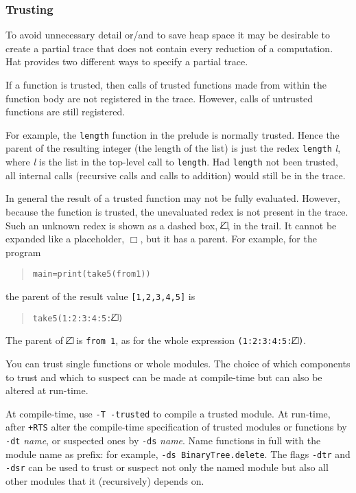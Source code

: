 \documentclass[12pt]{article}
\newenvironment{code}{\begin{quote}\begin{alltt}}{\end{alltt}\end{quote}}
\newcommand{\emptyBox}{\Box}
\newcommand{\dashedBox}{\Box\hspace{-9pt}\angle}
\begin{document}


\subsubsection{Trusting}\label{trusting}

To avoid unnecessary detail or/and to save heap space it may be desirable to create a partial trace that does not contain every reduction of a computation.
Hat provides two different ways to specify a partial trace.

If a function is trusted, then calls of trusted functions made from within the function body are not registered in the trace. However, calls of untrusted functions are still registered.

For example, the \texttt{length} function in the prelude is normally trusted. Hence the parent of the resulting integer (the length of the list) is just the redex \texttt{length} \emph{l}, where \emph{l} is the list in the top-level call to \texttt{length}. Had \texttt{length} not been trusted, all internal calls (recursive calls and calls to addition) would still be in the trace.

In general the result of a trusted function may not be fully evaluated. However, because the function is trusted, the unevaluated redex is not present in the trace. Such an unknown redex is shown as a dashed box, $\dashedBox$, in the trail. It cannot be expanded like a placeholder, $\emptyBox$, but it has a parent.
For example, for the program
\begin{code}
main = print (take 5 (from 1))
\end{code}  
the parent of the result value \texttt{[1,2,3,4,5]} is
\begin{code}
take 5 (1:2:3:4:5:\(\dashedBox\))
\end{code}
The parent of $\dashedBox$ is \texttt{from 1}, as for the whole expression
\texttt{(1:2:3:4:5:\(\dashedBox\))}.

You can trust single functions or whole modules.
The choice of which components to trust and which to suspect can be made at
compile-time but can also be altered at run-time.
   
At compile-time, use \texttt{-T -trusted} to compile a trusted module. 
At run-time, after \texttt{+RTS} alter the compile-time specification
of trusted modules or functions by \texttt{-dt} \emph{name}, or suspected
ones by \texttt{-ds} \emph{name}.  Name functions in full with the
module name as prefix: for example, \texttt{-ds BinaryTree.delete}.
The flags \texttt{-dtr} and \texttt{-dsr} can be used to trust or suspect not only the
named module but also all other modules that it (recursively) depends on.
 
\end{document}

